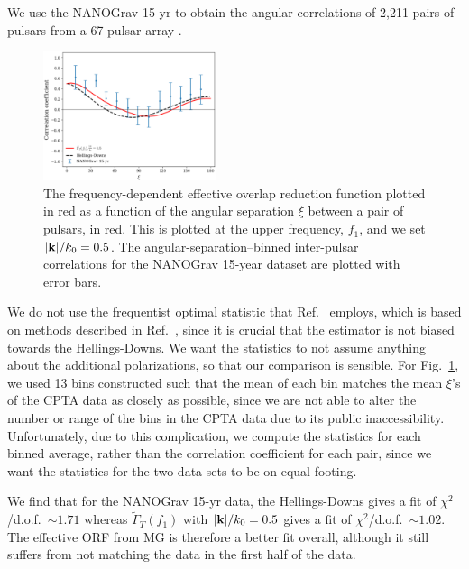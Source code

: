 \documentclass[prd,twocolumn,aps,psfig,nofootinbib,nobibnotes,superscriptaddress,preprintnumbers,times]{revtex4-2}
\begin{document}
We use the NANOGrav 15-yr to obtain the angular correlations of 2,211 pairs of pulsars from a 67-pulsar array \cite{Agazie:2023}. 
\begin{figure}[ht]
    \centering
    \includegraphics[width=0.45\textwidth]{fig2.pdf}
    \caption{The frequency-dependent effective overlap reduction function plotted in red as a function of the angular separation $\xi$ between a pair of pulsars, in red. This is plotted at the upper frequency, $f_1$, and we set $|{\bf k}|/k_0 = 0.5$. The angular-separation–binned inter-pulsar correlations for the NANOGrav 15-year dataset are plotted with error bars.}
    \label{fig:ng}
\end{figure}
We do not use the frequentist optimal statistic that Ref.\ \cite{Agazie:2023} employs, which is based on methods described in Ref.\ \cite{Allen:2022ksj}, since it is crucial that the estimator is not biased towards the Hellings-Downs. We want the statistics to not assume anything about the additional polarizations, so that our comparison is sensible. For Fig.\ \ref{fig:ng}, we used 13 bins constructed such that the mean of each bin matches the mean $\xi$'s of the CPTA data as closely as possible, since we are not able to alter the number or range of the bins in the CPTA data due to its public inaccessibility. Unfortunately, due to this complication, we compute the statistics for each binned average, rather than the correlation coefficient for each pair, since we want the statistics for the two data sets to be on equal footing. 

We find that for the NANOGrav 15-yr data, the Hellings-Downs gives a fit of $\chi^2$/d.o.f.\ $\sim 1.71$ whereas $\tilde{\Gamma}_T(f_1)$ with $|{\bf k}|/k_0 = 0.5$ gives a fit of $\chi^2$/d.o.f.\ $\sim 1.02$. The effective ORF from MG  is therefore a better fit overall, although it still suffers from not matching the data in the first half of the data.
\end{document}
